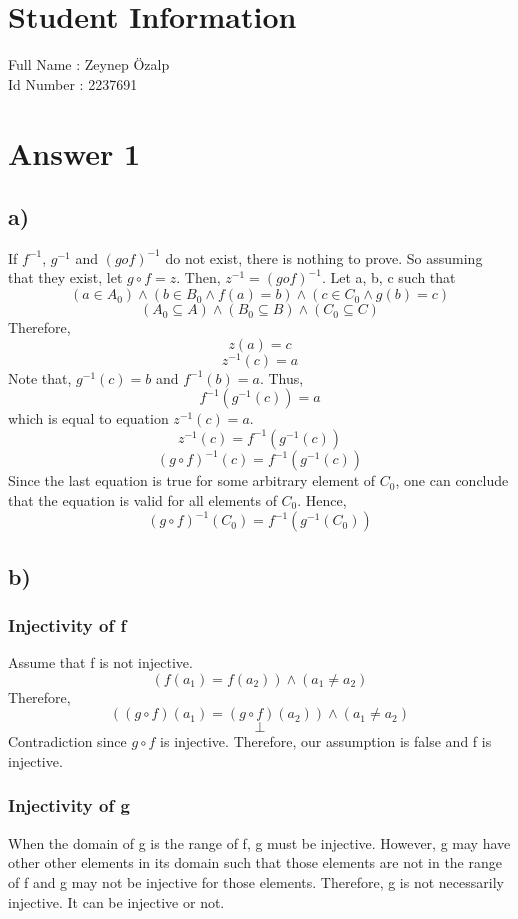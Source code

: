 \documentclass[12pt]{article}
\begin{document}
\section*{Student Information } 
Full Name : Zeynep Özalp \\
Id Number : 2237691 \\

\section*{Answer 1}
\subsection*{a)}
If $f^{-1}$, $g^{-1}$ and $(gof)^{-1}$ do not exist, there is nothing to prove. So assuming that they exist, let $g\circ f=z$. Then, $z^{-1}=(gof)^{-1}$. Let a, b, c such that 
$$(a \in A_0) \wedge (b \in B_0 \wedge f(a)=b) \wedge (c \in C_0 \wedge g(b)=c)$$
$$(A_0 \subseteq A) \wedge (B_0 \subseteq B) \wedge (C_0 \subseteq C)$$ 
Therefore, 
$$z(a)=c$$
$$z^{-1}(c)=a$$
Note that, $g^{-1}(c)=b$ and $f^{-1}(b)=a$. Thus,
$$f^{-1}(g^{-1}(c))=a$$ which is equal to equation $z^{-1}(c)=a$.
$$z^{-1}(c)=f^{-1}(g^{-1}(c))$$
$$(g\circ f)^{-1}(c)=f^{-1}(g^{-1}(c))$$
Since the last equation is true for some arbitrary element of $C_0$, one can conclude that the equation is valid for all elements of $C_0$. Hence,
$$(g\circ f)^{-1}(C_0)=f^{-1}(g^{-1}(C_0))$$

\subsection*{b)}
\subsubsection*{Injectivity of f}
Assume that f is not injective.
$$(f(a_1)=f(a_2)) \wedge (a_1 \neq a_2)$$
Therefore,
$$((g\circ f)(a_1)=(g\circ f)(a_2)) \wedge (a_1 \neq a_2)$$
$$\perp$$
Contradiction since $g\circ f$ is injective. Therefore, our assumption is false and f is injective. 
\subsubsection*{Injectivity of g}
When the domain of g is the range of f, g must be injective. However, g may have other other elements in its domain such that those elements are not in the range of f and g may not be injective for those elements. Therefore, g is not necessarily injective. It can be injective or not.
\end{document}
